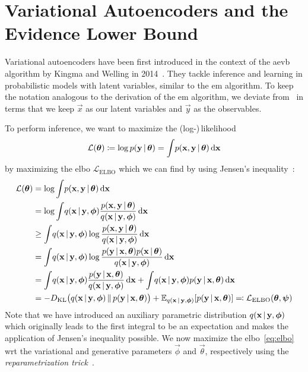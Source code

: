 \section{Variational Autoencoders and the Evidence Lower Bound}
	Variational autoencoders have been first introduced in the context of the \ac{aevb} algorithm by Kingma and Welling in 2014~\cite{kingmaAutoEncodingVariationalBayes2014}. They tackle inference and learning in probabilistic models with latent variables, similar to the \ac{em} algorithm. To keep the notation analogous to the derivation of the \ac{em} algorithm, we deviate from~\cite{kingmaAutoEncodingVariationalBayes2014} in terms that we keep \(\vec{x}\) as our latent variables and \(\vec{y}\) as the observables.

	To perform inference, we want to maximize the (log-)\,likelihood
	\begin{align*}
		\mathcal{L}(\vec{\theta}) \coloneqq \log p(\vec{y} \given \vec{\theta}) = \int\! p(\vec{x}, \vec{y} \given \vec{\theta}) \dd{\vec{x}}
	\end{align*}
	by maximizing the \ac{elbo} \( \mathcal{L}_\mathrm{ELBO} \) which we can find by using Jensen's inequality~\cite{jensenFonctionsConvexesInegalites1906}:
	\begin{align}
		\mathcal{L}(\vec{\theta})
			&= \log \int\! p(\vec{x}, \vec{y} \given \vec{\theta}) \dd{\vec{x}}  \nonumber \\
			&= \log \int\! q(\vec{x} \given \vec{y}, \vec{\phi}) \frac{p(\vec{x}, \vec{y} \given \vec{\theta})}{q(\vec{x} \given \vec{y}, \vec{\phi})} \dd{\vec{x}}  \nonumber \\
			&\geq \int\! q(\vec{x} \given \vec{y}, \vec{\phi}) \log \frac{p(\vec{x}, \vec{y} \given \vec{\theta})}{q(\vec{x} \given \vec{y}, \vec{\phi})} \dd{\vec{x}}  \nonumber \\
			&= \int\! q(\vec{x} \given \vec{y}, \vec{\phi}) \log \frac{p(\vec{y} \given \vec{x}, \vec{\theta}) p(\vec{x} \given \vec{\theta})}{q(\vec{x} \given \vec{y}, \vec{\phi})} \dd{\vec{x}}  \nonumber \\
			&= \int\! q(\vec{x} \given \vec{y}, \vec{\phi}) \frac{p(\vec{y} \given \vec{x}, \vec{\theta})}{q(\vec{x} \given \vec{y}, \vec{\phi})} \dd{\vec{x}} + \int\! q(\vec{x} \given \vec{y}, \vec{\phi}) p(\vec{y} \given \vec{x}, \vec{\theta}) \dd{\vec{x}}  \nonumber \\
			&= -\KL{q(\vec{x} \given \vec{y}, \vec{\phi})}{p(\vec{y} \given \vec{x}, \vec{\theta})} + \E_{q(\vec{x} \given \vec{y}, \vec{\phi})}[p(\vec{y} \given \vec{x}, \vec{\theta})] \eqqcolon \mathcal{L}_\mathrm{ELBO}(\vec{\theta}, \vec{\psi})  \label{eq:elbo}
	\end{align}
	Note that we have introduced an auxiliary parametric distribution \( q(\vec{x} \given \vec{y}, \vec{\phi}) \) which originally leads to the first integral to be an expectation and makes the application of Jensen's inequality possible. We now maximize the \ac{elbo}~\eqref{eq:elbo} \ac{wrt} the variational and generative parameters \(\vec{\phi}\) and \(\vec{\theta}\), respectively using the \emph{reparametrization trick}~\cite{kingmaAutoEncodingVariationalBayes2014}.

